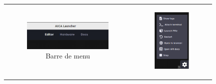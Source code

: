 \begin{figure}[H]
    \centering
    \begin{tabular}{cc}
        \begin{subfigure}{0.45\textwidth}
            \centering
            \includegraphics[width=0.9\linewidth]{assets/figures/AICA_barre_haute.png}
            \caption{Barre de menu}
            \label{fig:aica_barre_menu}
        \end{subfigure} &
        \begin{subfigure}{0.45\textwidth}
            \centering
            \includegraphics[width=0.9\linewidth]{assets/figures/AICA_rviz.png}

\end{subfigure}
\end{tabular}
\end{figure}

